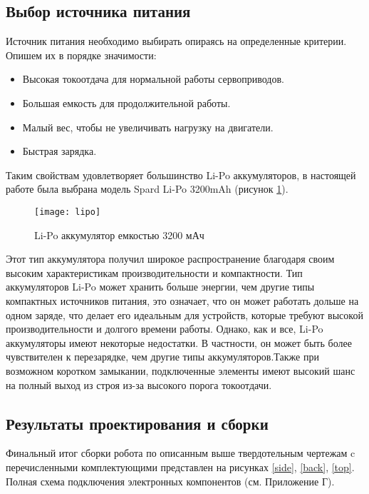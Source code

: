 \subsection{Выбор источника питания}\label{C4_4_4}
Источник питания необходимо выбирать опираясь на определенные критерии. Опишем их в порядке значимости:
\begin{itemize}
	\item Высокая токоотдача для нормальной работы сервоприводов.
	\item Большая емкость для продолжительной работы.
	\item Малый вес, чтобы не увеличивать нагрузку на двигатели.
	\item Быстрая зарядка.
\end{itemize}

Таким свойствам удовлетворяет большинство Li-Po аккумуляторов, в настоящей работе была выбрана модель Spard Li-Po 3200mAh (рисунок \ref{lipo}).
\begin{figure}[h!]
	\begin{center}
		\texttt{[image: lipo]}
		\caption{Li-Po аккумулятор емкостью 3200 мАч}
		\label{lipo}
	\end{center}
\end{figure}
Этот тип аккумулятора получил широкое распространение благодаря своим высоким характеристикам производительности и компактности. Тип аккумуляторов Li-Po может хранить больше энергии, чем другие типы компактных источников питания, это означает, что он может работать дольше на одном заряде, что делает его идеальным для устройств, которые требуют высокой производительности и долгого времени работы. Однако, как и все, Li-Po аккумуляторы имеют некоторые недостатки. В частности, он может быть более чувствителен к перезарядке, чем другие типы аккумуляторов.Также при возможном коротком замыкании, подключенные элементы имеют высокий шанс на полный выход из строя из-за высокого порога токоотдачи. 

\subsection{Результаты проектирования и сборки}\label{C4_4_5}

Финальный итог сборки робота по описанным выше твердотельным чертежам c перечисленными комплектующими представлен на  рисунках \ref{side}, \ref{back}, \ref{top}. Полная схема подключения электронных компонентов (см. Приложение Г).

